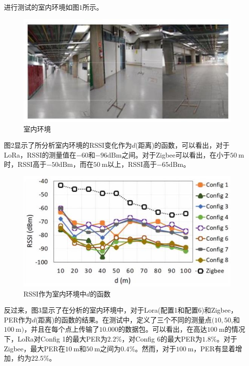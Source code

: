\documentclass[10pt]{ctexart}
\begin{document}
进行测试的室内环境如图$1$所示。

\begin{figure}[H]
  \centering
  \includegraphics[max width=\textwidth]{2022_02_28_100dc43db44c8290ce2ag-03}
  \renewcommand{\figurename}{图}
  \caption{室内环境}
\end{figure}


图2显示了所分析室内环境的RSSI变化作为$d$(距离)的函数，可以看出，对于LoRa，RSSI的测量值在$-60$和$-96\mathrm{dBm}$之间。对于Zigbee可以看出，在小于$50\mathrm{~m}$时，RSSI高于$-50\mathrm{dBm}$，而在$50\mathrm{~m}$以上，RSSI高于$-65\mathrm{dBm}$。

\begin{figure}[H]
  \centering
  \includegraphics[max width=\textwidth]{2022_02_28_100dc43db44c8290ce2ag-04}
  \renewcommand{\figurename}{图}
  \caption{RSSI作为室内环境中$d$的函数}
\end{figure}

反过来，图3显示了在分析的室内环境中，对于Lora(配置1和配置6)和Zigbee，PER作为$d$(距离)的函数的结果。在测试中，定义了三个不同的测量点$(10,50$,和$100\mathrm{~m})$，并且在每个点上传输了$10.000$的数据包。可以看出，在高达$100\mathrm{~m}$的情况下，LoRa对Config 1的最大PER为$2.2\%$，对Config 6的最大PER为$1.8\%$。对于Zigbee，最大PER在$10\mathrm{~m}$和$50\mathrm{~m}$之间为$0.4\%$。然而，对于$100\mathrm{~m}$，PER有显着增加，约为$22.5\%$。
\end{document}
